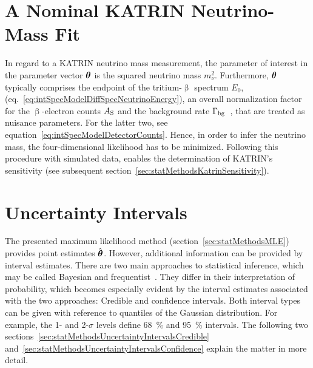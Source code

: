 \section{A Nominal KATRIN Neutrino-Mass Fit}
\label{sec:statMethodsStandardFit}
In regard to a KATRIN neutrino mass measurement, the parameter of interest in the parameter vector $\boldsymbol{\mathbf{\theta}}$ is the squared neutrino mass $m_\nu^2$. Furthermore, $\boldsymbol{\mathbf{\theta}}$ typically comprises the endpoint of the tritium-$\upbeta$ spectrum $E_0$, (eq.~\ref{eq:intSpecModelDiffSpecNeutrinoEnergy}), an overall normalization factor for the $\upbeta$-electron counts $A_{\mathrm{S}}$ and the background rate $\Gamma_{\mathrm{bg}}$~\cite{Kleesiek2014,Angrik:2005ep}, that are treated as nuisance parameters. For the latter two, see equation~\eqref{eq:intSpecModelDetectorCounts}. Hence, in order to infer the neutrino mass, the four-dimensional likelihood has to be minimized. Following this procedure with simulated data, enables the determination of KATRIN's sensitivity (see subsequent section~\ref{sec:statMethodsKatrinSensitivity}).

\section{Uncertainty Intervals}
\label{sec:statMethodsUncertaintyIntervals}
The presented maximum likelihood method (section~\ref{sec:statMethodsMLE}) provides point estimates $\hat{\boldsymbol{\mathbf{\theta}}}$. However, additional information can be provided by interval estimates. There are two main approaches to statistical inference, which may be called Bayesian and frequentist~\cite{ReviewOfParticlePhysics}. They differ in their interpretation of probability, which becomes especially evident by the interval estimates associated with the two approaches: Credible and confidence intervals. Both interval types can be given with reference to quantiles of the Gaussian distribution. For example, the 1- and 2-$\sigma$ levels define \SI{68}{\percent} and \SI{95}{\percent} intervals. The following two sections~\ref{sec:statMethodsUncertaintyIntervalsCredible} and~\ref{sec:statMethodsUncertaintyIntervalsConfidence} explain the matter in more detail.

